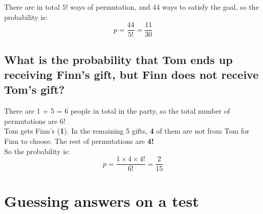 \documentclass{article}
\begin{document}
There are in total \( 5! \) ways of permutation, and 44 ways to satisfy the goal, so the probability is:
\[
p = \frac{44}{5!} = \frac{11}{30}
\]

\subsection{What is the probability that Tom ends up receiving Finn's gift, but Finn does not receive Tom's gift?}

There are 1 + 5 = 6 people in total in the party, so the total number of permutations are 6! \\
Tom gets Finn's (\textbf{1}). In the remaining 5 gifts, \textbf{4} of them are not from Tom for Finn to choose. The rest of permutations are \textbf{4!}\\
So the probability is:
\[
p = \frac{1 \times 4 \times 4! }{6!} = \frac{2}{15}
\]

\section{Guessing answers on a test}
\end{document}
